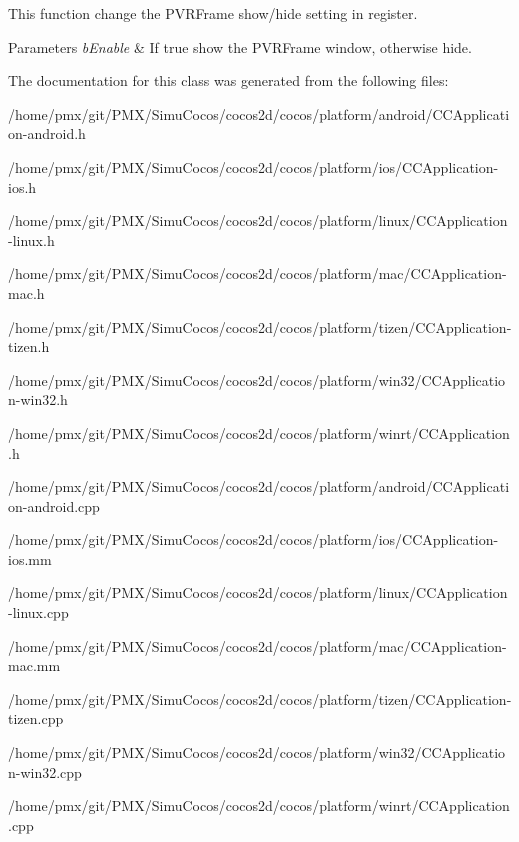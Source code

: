This function change the P\+V\+R\+Frame show/hide setting in register. 


\begin{DoxyParams}{Parameters}
{\em b\+Enable} & If true show the P\+V\+R\+Frame window, otherwise hide. \\
\hline
\end{DoxyParams}


The documentation for this class was generated from the following files\+:\begin{DoxyCompactItemize}
\item 
/home/pmx/git/\+P\+M\+X/\+Simu\+Cocos/cocos2d/cocos/platform/android/C\+C\+Application-\/android.\+h\item 
/home/pmx/git/\+P\+M\+X/\+Simu\+Cocos/cocos2d/cocos/platform/ios/C\+C\+Application-\/ios.\+h\item 
/home/pmx/git/\+P\+M\+X/\+Simu\+Cocos/cocos2d/cocos/platform/linux/C\+C\+Application-\/linux.\+h\item 
/home/pmx/git/\+P\+M\+X/\+Simu\+Cocos/cocos2d/cocos/platform/mac/C\+C\+Application-\/mac.\+h\item 
/home/pmx/git/\+P\+M\+X/\+Simu\+Cocos/cocos2d/cocos/platform/tizen/C\+C\+Application-\/tizen.\+h\item 
/home/pmx/git/\+P\+M\+X/\+Simu\+Cocos/cocos2d/cocos/platform/win32/C\+C\+Application-\/win32.\+h\item 
/home/pmx/git/\+P\+M\+X/\+Simu\+Cocos/cocos2d/cocos/platform/winrt/C\+C\+Application.\+h\item 
/home/pmx/git/\+P\+M\+X/\+Simu\+Cocos/cocos2d/cocos/platform/android/C\+C\+Application-\/android.\+cpp\item 
/home/pmx/git/\+P\+M\+X/\+Simu\+Cocos/cocos2d/cocos/platform/ios/C\+C\+Application-\/ios.\+mm\item 
/home/pmx/git/\+P\+M\+X/\+Simu\+Cocos/cocos2d/cocos/platform/linux/C\+C\+Application-\/linux.\+cpp\item 
/home/pmx/git/\+P\+M\+X/\+Simu\+Cocos/cocos2d/cocos/platform/mac/C\+C\+Application-\/mac.\+mm\item 
/home/pmx/git/\+P\+M\+X/\+Simu\+Cocos/cocos2d/cocos/platform/tizen/C\+C\+Application-\/tizen.\+cpp\item 
/home/pmx/git/\+P\+M\+X/\+Simu\+Cocos/cocos2d/cocos/platform/win32/C\+C\+Application-\/win32.\+cpp\item 
/home/pmx/git/\+P\+M\+X/\+Simu\+Cocos/cocos2d/cocos/platform/winrt/C\+C\+Application.\+cpp\end{DoxyCompactItemize}

